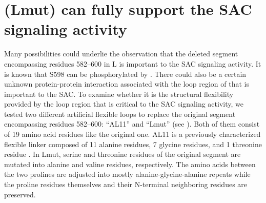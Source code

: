 \section{(Lmut) can fully support the SAC signaling activity}

Many possibilities could underlie the observation that the deleted segment encompassing residues 582--600 in \textDelta{}L is important to the SAC signaling activity. It is known that S598 can be phosphorylated by   \cite{MAD1_pS598}. There could also be a certain unknown protein-protein interaction associated with the loop region of  that is important to the SAC. To examine whether it is the structural flexibility provided by the loop region that is critical to the SAC signaling activity, we tested two different artificial flexible loops to replace the original segment encompassing residues 582--600: ``AL11'' and ``Lmut'' (see ). Both of them consist of 19 amino acid residues like the original one. AL11 is a previously characterized flexible linker composed of 11 alanine residues, 7 glycine residues, and 1 threonine residue \cite{AL11}. In Lmut, serine and threonine residues of the original segment are mutated into alanine and valine residues, respectively. The amino acids between the two prolines are adjusted into mostly alanine-glycine-alanine repeats while the proline residues themselves and their N-terminal neighboring residues are preserved. %

